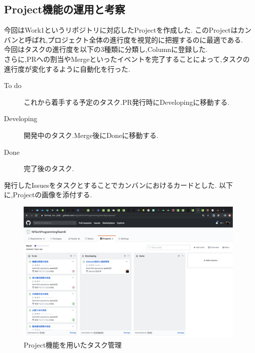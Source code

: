 \documentclass[uplatex,12pt]{jsarticle}
\begin{document}
\subsection{Project機能の運用と考察}
今回はWork1というリポジトリに対応したProjectを作成した.
このProjectはカンバンと呼ばれ,プロジェクト全体の進行度を視覚的に把握するのに最適である. \\
今回はタスクの進行度を以下の3種類に分類し,Columnに登録した. \\
さらに,PRへの割当やMergeといったイベントを完了することによって,タスクの進行度が変化するように自動化を行った.
\begin{description}
  \item[To do] これから着手する予定のタスク.PR発行時にDevelopingに移動する.
  \item[Developing] 開発中のタスク.Merge後にDoneに移動する.
  \item[Done] 完了後のタスク.
\end{description}
発行したIssuesをタスクとすることでカンバンにおけるカードとした.
以下に,Projectの画像を添付する.

\begin{figure}[!hbt]
  \centering
  \includegraphics[scale=0.25]{git_image/project_image.png}
  \caption{Project機能を用いたタスク管理}
\end{figure}

\newpage
\end{document}
